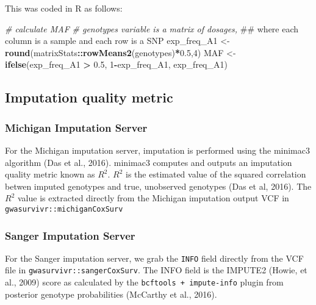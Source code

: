 \documentclass[]{DissertateUSU}
\newenvironment{Shaded}{\begin{snugshade}}{\end{snugshade}}
\newcommand{\KeywordTok}[1]{\textcolor[rgb]{0.13,0.29,0.53}{\textbf{#1}}}
\newcommand{\DecValTok}[1]{\textcolor[rgb]{0.00,0.00,0.81}{#1}}
\newcommand{\FloatTok}[1]{\textcolor[rgb]{0.00,0.00,0.81}{#1}}
\newcommand{\StringTok}[1]{\textcolor[rgb]{0.31,0.60,0.02}{#1}}
\newcommand{\CommentTok}[1]{\textcolor[rgb]{0.56,0.35,0.01}{\textit{#1}}}
\newcommand{\OperatorTok}[1]{\textcolor[rgb]{0.81,0.36,0.00}{\textbf{#1}}}
\newcommand{\NormalTok}[1]{#1}
\begin{document}
This was coded in R as follows:

\begin{Shaded}
\begin{Highlighting}[]
\CommentTok{# calculate MAF}
\CommentTok{# genotypes variable is a matrix of dosages, }
\NormalTok{## where each column is a sample and each row is a SNP}
\NormalTok{exp_freq_A1 <-}\StringTok{ }\KeywordTok{round}\NormalTok{(matrixStats}\OperatorTok{::}\KeywordTok{rowMeans2}\NormalTok{(genotypes)}\OperatorTok{*}\FloatTok{0.5}\NormalTok{,}\DecValTok{4}\NormalTok{)}
\NormalTok{MAF <-}\StringTok{ }\KeywordTok{ifelse}\NormalTok{(exp_freq_A1 }\OperatorTok{>}\StringTok{ }\FloatTok{0.5}\NormalTok{,}
                  \DecValTok{1}\OperatorTok{-}\NormalTok{exp_freq_A1,}
\NormalTok{                  exp_freq_A1)}
\end{Highlighting}
\end{Shaded}

\subsection{Imputation quality metric}\label{imputation-quality-metric}

\subsubsection{Michigan Imputation
Server}\label{michigan-imputation-server}

For the Michigan imputation server, imputation is performed using the
minimac3 algorithm (Das et al., 2016). minimac3 computes and outputs an
imputation quality metric known as \(R^2\). \(R^2\) is the estimated
value of the squared correlation betwen imputed genotypes and true,
unobserved genotypes (Das et al, 2016). The \(R^2\) value is extracted
directly from the Michigan imputation output VCF in
\texttt{gwasurvivr::michiganCoxSurv}

\subsubsection{Sanger Imputation Server}\label{sanger-imputation-server}

For the Sanger imputation server, we grab the \texttt{INFO} field
directly from the VCF file in \texttt{gwasurvivr::sangerCoxSurv}. The
INFO field is the IMPUTE2 (Howie, et al., 2009) score as calculated by
the \texttt{bcftools\ +\ impute-info} plugin from posterior genotype
probabilities (McCarthy et al., 2016).
\end{document}
